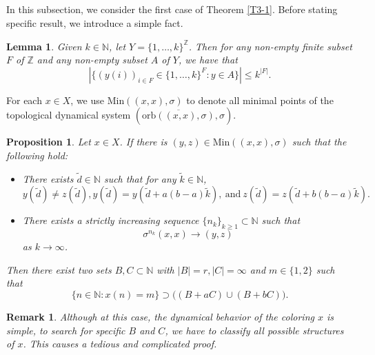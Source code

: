 \documentclass[reqno,12pt]{amsart}
\newtheorem{lemma}[thm]{Lemma}
\newtheorem{prop}[thm]{Proposition}
\newtheorem{rem}[thm]{Remark}
\def \N {\mathbb N}
\def \Z {\mathbb Z}
\numberwithin{equation}{section}
\begin{document}
\subsection{}
In this subsection, we consider the first case of Theorem \ref{T3-1}. Before stating specific result, we introduce a simple fact.
\begin{lemma}\label{lem7}
	Given $k\in \N$, let $Y=\{1,\ldots,k\}^{\Z}$. Then for any non-empty finite subset $F$ of $\Z$ and any non-empty subset $A$ of $Y$, we have that
	$$|\{(y(i))_{i\in F}\in \{1,\ldots,k\}^{F}:y\in A\}|\le k^{|F|}.$$
\end{lemma}

For each $x\in X$, we use $\text{Min}((x,x),\sigma)$ to denote all minimal points of the topological dynamical system $(\overline{\text{orb}((x,x),\sigma)},\sigma)$. 
\begin{prop}\label{pro1}
	Let $x\in X$. If there is $(y,z)\in \text{Min}((x,x),\sigma)$ such that the following hold:
	\begin{itemize}
		\item There exists $\tilde{d}\in \N$ such that for any $\tilde{k}\in \N$,
		\begin{equation}\label{value of (y,z)}y(\tilde{d})\neq z(\tilde{d}),y(\tilde{d})=y(\tilde{d}+a(b-a)\tilde{k}),\ \text{and}\ z(\tilde{d})=z(\tilde{d}+b(b-a)\tilde{k}).\end{equation}
		\item There exists a strictly increasing sequence $\{n_k\}_{k\ge 1}\subset \N$ such that $$\sigma^{n_k}(x,x)\to (y,z)$$ as $k\to\infty$.
	\end{itemize}
	
	 Then there exist two sets $B,C\subset \N$ with $|B|=r,|C|=\infty$ and $m\in \{1,2\}$ such that
\begin{equation}\label{main goal}
\{n\in \N:x(n)=m\}\supset \big((B+aC)\cup (B+bC)\big).\end{equation}
\end{prop}
\begin{rem}
	Although at this case, the dynamical behavior of the coloring $x$ is simple, to search for specific $B$ and $C$, we have to classify all possible structures of $x$. This causes a tedious and complicated proof.
\end{rem}
\end{document}
